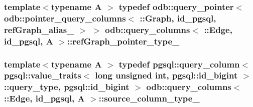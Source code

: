\subsubsection[{ref\+Graph\+\_\+pointer\+\_\+type\+\_\+}]{\setlength{\rightskip}{0pt plus 5cm}template$<$typename A $>$ typedef odb\+::query\+\_\+pointer$<$ odb\+::pointer\+\_\+query\+\_\+columns$<$ \+::{\bf Graph}, id\+\_\+pgsql, {\bf ref\+Graph\+\_\+alias\+\_\+} $>$ $>$ odb\+::query\+\_\+columns$<$ \+::{\bf Edge}, id\+\_\+pgsql, A $>$\+::{\bf ref\+Graph\+\_\+pointer\+\_\+type\+\_\+}}\label{structodb_1_1query__columns_3_01_1_1_edge_00_01id__pgsql_00_01_a_01_4_aa7a5334fc9c390c29710c3937ac9c8ac}
\hypertarget{structodb_1_1query__columns_3_01_1_1_edge_00_01id__pgsql_00_01_a_01_4_a9fe5ac5b9cd38d44a2420d62629076fe}{}
\subsubsection[{source\+\_\+column\+\_\+type\+\_\+}]{\setlength{\rightskip}{0pt plus 5cm}template$<$typename A $>$ typedef pgsql\+::query\+\_\+column$<$ pgsql\+::value\+\_\+traits$<$ long unsigned int, pgsql\+::id\+\_\+bigint $>$\+::query\+\_\+type, pgsql\+::id\+\_\+bigint $>$ odb\+::query\+\_\+columns$<$ \+::{\bf Edge}, id\+\_\+pgsql, A $>$\+::{\bf source\+\_\+column\+\_\+type\+\_\+}}\label{structodb_1_1query__columns_3_01_1_1_edge_00_01id__pgsql_00_01_a_01_4_a9fe5ac5b9cd38d44a2420d62629076fe}
\hypertarget{structodb_1_1query__columns_3_01_1_1_edge_00_01id__pgsql_00_01_a_01_4_aba8b61cdeb2c359f6cc1e53aac7d1e71}{}
